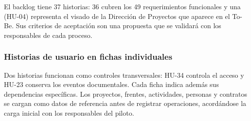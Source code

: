 \documentclass[12pt,letterpaper]{article}
\begin{document}
El backlog tiene 37 historias: 36 cubren los 49 requerimientos funcionales y una (HU-04) representa el visado de la Dirección de Proyectos que aparece en el To-Be. Sus criterios de aceptación son una propuesta que se validará con los responsables de cada proceso.

\begingroup
\setlength{\tabcolsep}{4pt}
\renewcommand{\arraystretch}{1.12}

\newcommand{\huCampo}[1]{\cellcolor{docHead}\textbf{#1}}
\newcommand{\huBanda}[1]{%
  \multicolumn{2}{|>{\columncolor{docHead}\centering\arraybackslash}p{\dimexpr\linewidth-2\tabcolsep-2\arrayrulewidth\relax}|}{\textbf{#1}}\\\hline}
\newcommand{\huFichaModelo}[9]{%
  \par\addvspace{0.5em}
  {\small
  \begin{longtable}{|L{4.2cm}|L{\dimexpr\linewidth-4.2cm-4\tabcolsep-3\arrayrulewidth\relax}|}
    \hline
    \huCampo{Título de la \mbox{#1}} & \textbf{#2}\\\hline
    \huCampo{Módulo} & #4\\\hline
    \endfirsthead
    \hline
    \multicolumn{2}{|L{\dimexpr\linewidth-2\tabcolsep-2\arrayrulewidth\relax}|}{\textbf{#1: #2} (continuación)}\\\hline
    \endhead
    \multicolumn{2}{|r|}{\footnotesize Continúa en la página siguiente}\\\hline\endfoot
    \endlastfoot
    \huBanda{Descripción de la historia de Usuario}
    \huCampo{Cómo (Rol)} & #5\\\hline
    \huCampo{Quiero (Proceso)} & #6\\\hline
    \huCampo{Para (Resultado)} & #7\\\hline
    #8
  \end{longtable}
  \textbf{Prioridad y esfuerzo:} #3.\par
  #9\par}
}

\subsubsection{Historias de usuario en fichas individuales}
\label{sec:hu-fichas}
Dos historias funcionan como controles transversales: HU-34 controla el acceso y HU-23 conserva los eventos documentales. Cada ficha indica además sus dependencias específicas. Los proyectos, frentes, actividades, personas y contratos se cargan como datos de referencia antes de registrar operaciones, acordándose la carga inicial con los responsables del piloto.
\end{document}
